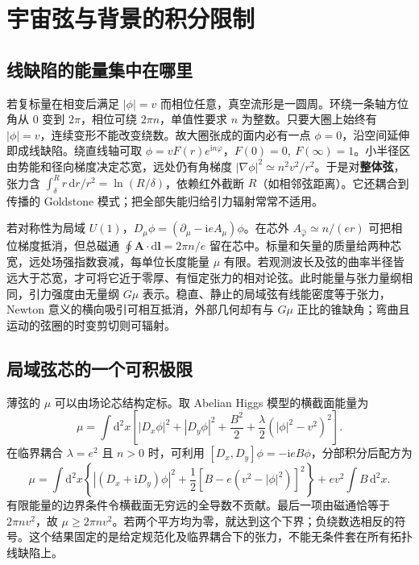 \section{宇宙弦与背景的积分限制}\label{sec:gw-dstrings}

\subsection{线缺陷的能量集中在哪里}

若复标量在相变后满足 $|\phi|=v$ 而相位任意，真空流形是一圆周。环绕一条轴方位角从 $0$ 变到 $2\pi$，相位可绕 $2\pi n$，单值性要求 $n$ 为整数。只要大圈上始终有 $|\phi|=v$，连续变形不能改变绕数。故大圈张成的面内必有一点 $\phi=0$，沿空间延伸即成线缺陷。绕直线轴可取 $\phi=vF(r)e^{\mathrm i n\varphi}$，$F(0)=0,\ F(\infty)=1$。小半径区由势能和径向梯度决定芯宽，远处仍有角梯度 $|\nabla\phi|^2\simeq n^2v^2/r^2$。于是对\textbf{整体弦}，张力含 $\int_\delta^Rr\,\mathrm dr/r^2=\ln(R/\delta)$，依赖红外截断 $R$（如相邻弦距离）。它还耦合到传播的 Goldstone 模式；把全部失能归给引力辐射常常不适用。

若对称性为局域 $U(1)$，$D_\mu\phi=(\partial_\mu-\mathrm i e A_\mu)\phi$。在芯外 $A_{\hat\varphi}\simeq n/(er)$ 可把相位梯度抵消，但总磁通 $\oint\bm A\cdot\mathrm d\bm l=2\pi n/e$ 留在芯中。标量和矢量的质量给两种芯宽，远处场强指数衰减，每单位长度能量 $\mu$ 有限。若观测波长及弦的曲率半径皆远大于芯宽，才可将它近于零厚、有恒定张力的相对论弦。此时能量与张力量纲相同，引力强度由无量纲 $G\mu$ 表示。稳直、静止的局域弦有线能密度等于张力，Newton 意义的横向吸引可相互抵消，外部几何却有与 $G\mu$ 正比的锥缺角；弯曲且运动的弦圈的时变剪切则可辐射。


\subsection{局域弦芯的一个可积极限}

薄弦的 $\mu$ 可以由场论芯结构定标。取 Abelian Higgs 模型的横截面能量为
\[
 \mu=\int\mathrm d^2x\left[|D_x\phi|^2+|D_y\phi|^2
 +\frac{B^2}{2}+\frac{\lambda}{2}(|\phi|^2-v^2)^2\right].
\]
在临界耦合 $\lambda=e^2$ 且 $n>0$ 时，可利用 $[D_x,D_y]\phi=-\mathrm i eB\phi$，分部积分后配方为
\[
 \mu=\int\mathrm d^2x\left\{|(D_x+\mathrm iD_y)\phi|^2+
 \frac12[B-e(v^2-|\phi|^2)]^2\right\}
 +ev^2\int B\,\mathrm d^2x .
\]
有限能量的边界条件令横截面无穷远的全导数不贡献。最后一项由磁通恰等于 $2\pi n v^2$，故 $\mu\ge2\pi n v^2$。若两个平方均为零，就达到这个下界；负绕数选相反的符号。这个结果固定的是给定规范化及临界耦合下的张力，不能无条件套在所有拓扑线缺陷上。

